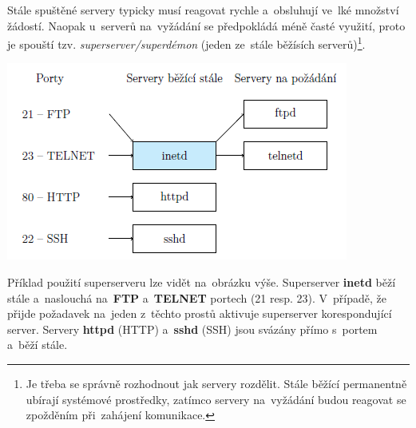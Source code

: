 Stále spuštěné servery typicky musí reagovat rychle a~obsluhují ve~lké množství žádostí. Naopak u~serverů na~vyžádání se předpokládá méně časté využití, proto je spouští tzv. \emph{superserver/superdémon} (jeden ze~stále běžísích serverů)\footnote{Je třeba se správně rozhodnout jak servery rozdělit. Stále běžící permanentně ubírají systémové prostředky, zatímco servery na~vyžádání budou reagovat se zpožděním při~zahájení komunikace.}.

\begin{center}
	\vspace{0,5cm}
	\includegraphics[scale=1]{images/network_server_proc.png}
\end{center}

Příklad použití superserveru lze vidět na~obrázku výše. Superserver \textbf{inetd} běží stále a~naslouchá na~\textbf{FTP} a~\textbf{TELNET} portech (21 resp. 23). V~případě, že přijde požadavek na~jeden z~těchto prostů aktivuje superserver korespondující server. Servery \textbf{httpd} (HTTP) a~\textbf{sshd} (SSH) jsou svázány přímo s~portem a~běží stále.


